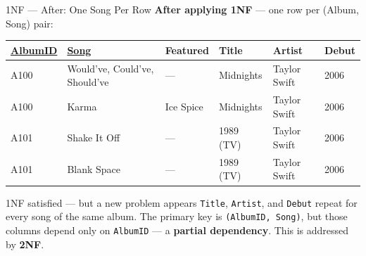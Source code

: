 \begin{frame}{1NF --- After: One Song Per Row}
  \textbf{After applying 1NF} --- one row per (Album, Song) pair:

  \vspace{6pt}
  \begin{center}
  \scriptsize
  \begin{tabular}{llllll}
    \toprule
    \textbf{\underline{AlbumID}} & \textbf{\underline{Song}} & \textbf{Featured} & \textbf{Title} & \textbf{Artist} & \textbf{Debut} \\
    \midrule
    A100 & Would've, Could've, Should've & ---       & Midnights & Taylor Swift & 2006 \\
    A100 & Karma                         & Ice Spice & Midnights & Taylor Swift & 2006 \\
    A101 & Shake It Off                  & ---       & 1989 (TV) & Taylor Swift & 2006 \\
    A101 & Blank Space                   & ---       & 1989 (TV) & Taylor Swift & 2006 \\
    \bottomrule
  \end{tabular}
  \end{center}
  \normalsize

  \vspace{6pt}
  \begin{alertblock}{1NF satisfied --- but a new problem appears}
    \texttt{Title}, \texttt{Artist}, and \texttt{Debut} repeat for every song of
    the same album.  The primary key is \texttt{(AlbumID, Song)}, but those
    columns depend only on \texttt{AlbumID} --- a \textbf{partial dependency}.
    This is addressed by \textbf{2NF}.
  \end{alertblock}
\end{frame}

